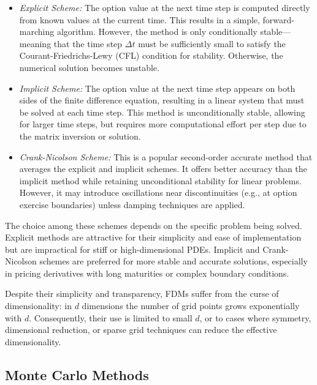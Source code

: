 \documentclass[12pt]{report} %
\theoremstyle{plain} %
\theoremstyle{definition} %
\theoremstyle{remark} %
\begin{document}
\begin{itemize}
    \item \textit{Explicit Scheme:} The option value at the next 
	time step is computed directly from known values at the current time. 
	This results in a simple, forward-marching algorithm. However, 
	the method is only conditionally stable—meaning that the time 
	step \(\Delta t\) must be sufficiently small to satisfy the 
	Courant-Friedrichs-Lewy (CFL) condition for stability. Otherwise, 
	the numerical solution becomes unstable.

    \item \textit{Implicit Scheme:} The option value at the next time 
	step appears on both sides of the finite difference equation, 
	resulting in a linear system that must be solved at each time step. 
	This method is unconditionally stable, allowing for larger time steps, 
	but requires more computational effort per step due to the matrix 
	inversion or solution.

    \item \textit{Crank-Nicolson Scheme:} This is a popular second-order 
	accurate method that averages the explicit and implicit schemes. It offers 
	better accuracy than the implicit method while retaining unconditional 
	stability for linear problems. However, it may introduce oscillations near 
	discontinuities (e.g., at option exercise boundaries) unless damping 
	techniques are applied.
\end{itemize}

The choice among these schemes depends on the specific problem being solved. 
Explicit methods are attractive for their simplicity and ease of implementation 
but are impractical for stiff or high-dimensional PDEs. Implicit and Crank-Nicolson 
schemes are preferred for more stable and accurate solutions, especially 
in pricing derivatives with long maturities or complex boundary conditions.

Despite their simplicity and transparency, FDMs suffer from the curse of 
dimensionality: in \(d\) dimensions the number of grid points grows exponentially 
with \(d\). Consequently, their use is limited to small \(d\), or to cases where 
symmetry, dimensional reduction, or sparse grid techniques can reduce the effective 
dimensionality.

\subsection{Monte Carlo Methods}
\end{document}
